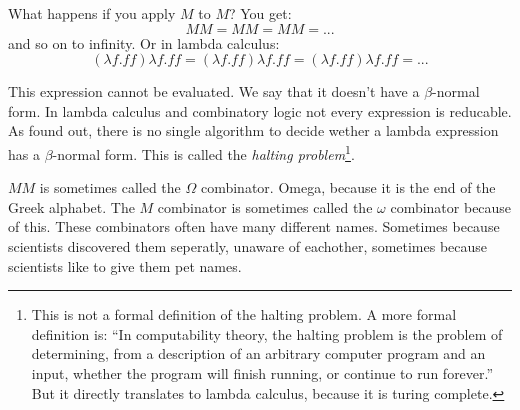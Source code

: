 \documentclass[a4paper]{article}
\begin{document}
What happens if you apply \(M\) to \(M\)? You get:
\[M M = M M = M M = ...\]
and so on to infinity. Or in lambda calculus:
\[(\lambda f.ff)\lambda f.ff=(\lambda f.ff)\lambda f.ff=(\lambda f.ff)\lambda f.ff=...\]

This expression cannot be evaluated. We say that it doesn't have a
\(\beta\)-normal form. In lambda calculus and combinatory logic not every
expression is reducable. As \textcite{turing1936} found out, there is no single
algorithm to decide wether a lambda expression has a \(\beta\)-normal form.
This is called the \emph{halting problem}\footnote{This is not a formal
definition of the halting problem. A more formal definition is: ``In
computability theory, the halting problem is the problem of determining, from a
description of an arbitrary computer program and an input, whether the program
will finish running, or continue to run forever.'' But it directly translates
to lambda calculus, because it is turing complete.}.

\(M M\) is sometimes called the \(\Omega\) combinator. Omega, because it is the
end of the Greek alphabet. The \(M\) combinator is sometimes called the
\(\omega\) combinator because of this. These combinators often have many
different names. Sometimes because scientists discovered them seperatly,
unaware of eachother, sometimes because scientists like to give them pet names.




\newpage
\printbibliography
\end{document}
